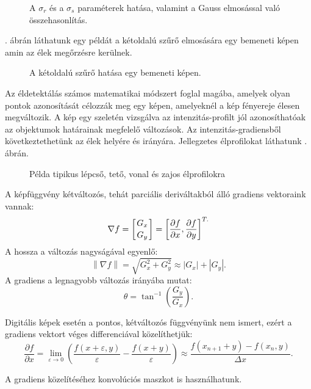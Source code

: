 \begin{figure}[h!]
\centering
{}
\caption{A $\sigma_r$ és a $\sigma_s$ paraméterek hatása, valamint a Gauss elmosással való összehasonlítás.} 
\label{fig:bilateral}
\end{figure}

 . ábrán láthatunk egy példát a kétoldalú szűrő elmosására egy bemeneti képen amin az élek megőrzésre kerülnek.

\begin{figure}[h!]
\centering
{}
\caption{A kétoldalú szűrő hatása egy bemeneti képen.} 
\label{fig:bilateral1}
\end{figure}

Az éldetektálás számos matematikai módszert foglal magába, amelyek olyan pontok azonosítását célozzák meg egy képen, amelyeknél a kép fényereje élesen megváltozik. A kép egy szeletén vizsgálva az intenzitás-profilt jól azonosíthatóak az objektumok határainak megfelelő változások. Az intenzitás-gradiensből következtethetünk az élek helyére és irányára. Jellegzetes élprofilokat láthatunk . ábrán.

\begin{figure}[ht]
\centering
{}
\caption{Példa tipikus lépcső, tető, vonal és zajos élprofilokra} 
\label{fig:elprofilok}
\end{figure}

A képfüggvény kétváltozós, tehát parciális deriváltakból álló gradiens vektoraink vannak: 
$$
\nabla f =
\left[ \genfrac{}{}{0pt}{}{G_x}{G_y} \right] =
\left[ \frac{\partial f}{\partial x}, \frac{\partial f}{\partial y}  \right]^{T.}$$
A hossza a változás nagyságával egyenlő: 
$$
\left\| \nabla f \right \| =
\sqrt{G_{x}^{2}+G_{y}^{2}} \approx
\left | G_x  \right |+\left | G_y  \right |.
$$
A gradiens a legnagyobb változás irányába mutat: 
$$
\theta = \tan^{-1}\left(\frac{G_y}{G_x}\right).
$$

Digitális képek esetén a pontos, kétváltozós függvényünk nem ismert, ezért a gradiens vektort véges differenciával közelíthetjük:
$$
\frac{\partial f}{\partial x} =
\lim_{\varepsilon \to 0} \left(
\frac{f(x+\varepsilon,y)}{\varepsilon}-\frac{f(x+y)}{\varepsilon}
\right) \approx
\frac{f(x_{n+1}+y)-f(x_n,y)}{\Delta x}.
$$

A gradiens közelítéséhez konvolúciós maszkot is használhatunk.

